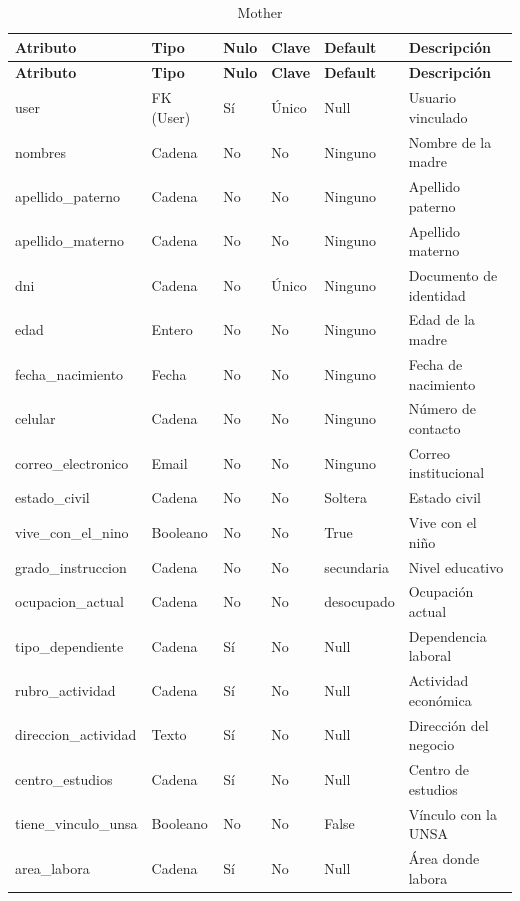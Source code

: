 \documentclass{article}
\begin{document}
\begin{longtable}{|l|l|l|l|l|l|}
\caption{Mother} \\
\hline
\rowcolor{tabledictionariesbackground}
\textbf{Atributo} & \textbf{Tipo} & \textbf{Nulo} & \textbf{Clave} & \textbf{Default} & \textbf{Descripción} \\
\hline
\endfirsthead
\hline
\rowcolor{tabledictionariesbackground}
\textbf{Atributo} & \textbf{Tipo} & \textbf{Nulo} & \textbf{Clave} & \textbf{Default} & \textbf{Descripción} \\
\hline
\endhead
user & FK (User) & Sí & Único & Null & Usuario vinculado \\
nombres & Cadena & No & No & Ninguno & Nombre de la madre \\
apellido\_paterno & Cadena & No & No & Ninguno & Apellido paterno \\
apellido\_materno & Cadena & No & No & Ninguno & Apellido materno \\
dni & Cadena & No & Único & Ninguno & Documento de identidad \\
edad & Entero & No & No & Ninguno & Edad de la madre \\
fecha\_nacimiento & Fecha & No & No & Ninguno & Fecha de nacimiento \\
celular & Cadena & No & No & Ninguno & Número de contacto \\
correo\_electronico & Email & No & No & Ninguno & Correo institucional \\
estado\_civil & Cadena & No & No & Soltera & Estado civil \\
vive\_con\_el\_nino & Booleano & No & No & True & Vive con el niño \\
grado\_instruccion & Cadena & No & No & secundaria & Nivel educativo \\
ocupacion\_actual & Cadena & No & No & desocupado & Ocupación actual \\
tipo\_dependiente & Cadena & Sí & No & Null & Dependencia laboral \\
rubro\_actividad & Cadena & Sí & No & Null & Actividad económica \\
direccion\_actividad & Texto & Sí & No & Null & Dirección del negocio \\
centro\_estudios & Cadena & Sí & No & Null & Centro de estudios \\
tiene\_vinculo\_unsa & Booleano & No & No & False & Vínculo con la UNSA \\
area\_labora & Cadena & Sí & No & Null & Área donde labora \\

\end{longtable}
\end{document}
